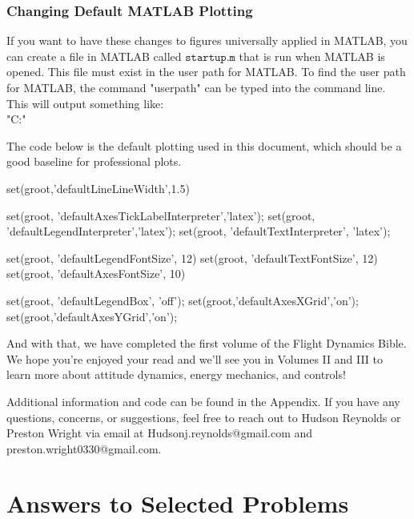 \documentclass[10pt, openany, titlepage]{book}
\theoremstyle{definition}
\renewcommand{\chapterautorefname}{Chapter}
\begin{document}
\subsection{Changing Default MATLAB Plotting}
If you want to have these changes to figures universally applied in MATLAB, you can create a file in MATLAB called $\texttt{startup.m}$ that is run when MATLAB is opened. This file must exist in the user path for MATLAB. To find the user path for MATLAB, the command "userpath" can be typed into the command line. This will output something like:
\\
"C:\Users\YourName\OneDrive\Documents\MATLAB"

The code below is the default plotting used in this document, which should be a good baseline for professional plots.

\begin{matlabscript}{}
set(groot,'defaultLineLineWidth',1.5)

set(groot, 'defaultAxesTickLabelInterpreter','latex'); 
set(groot, 'defaultLegendInterpreter','latex');
set(groot, 'defaultTextInterpreter', 'latex');

set(groot, 'defaultLegendFontSize', 12)
set(groot, 'defaultTextFontSize', 12)
set(groot, 'defaultAxesFontSize', 10)

set(groot, 'defaultLegendBox', 'off');
set(groot,'defaultAxesXGrid','on');
set(groot,'defaultAxesYGrid','on');
\end{matlabscript}


And with that, we have completed the first volume of the Flight Dynamics Bible. We hope you're enjoyed your read and we'll see you in Volumes II and III to learn more about attitude dynamics, energy mechanics, and controls!

Additional information and code can be found in the Appendix. If you have any questions, concerns, or suggestions, feel free to reach out to Hudson Reynolds or Preston Wright via email at Hudsonj.reynolds@gmail.com and preston.wright0330@gmail.com.

\newpage
\printendnotes[large]


\appendix
\addappheadtotoc

\renewcommand{\chaptername}{Appendix}
\renewcommand{\chapterautorefname}{Appendix}

\chapter{Answers to Selected Problems}
\end{document}
